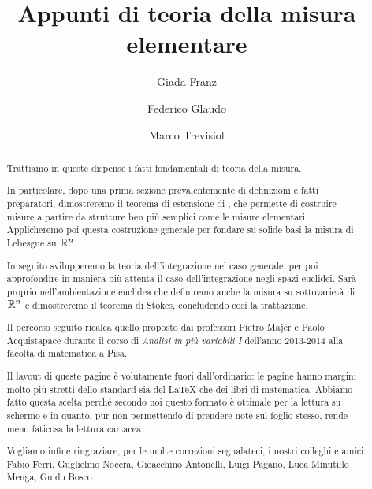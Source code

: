 \documentclass[a4paper,12pt]{article}
\title{Appunti di teoria della misura elementare}
\author{Giada Franz \and Federico Glaudo \and Marco Trevisiol}
\begin{document}
\maketitle

\begin{abstract}
	Trattiamo in queste dispense i fatti fondamentali di teoria della misura.
	
	In particolare, dopo una prima sezione prevalentemente di definizioni e fatti preparatori, dimostreremo il teorema di estensione di \carat{}, che permette di costruire misure a partire da strutture ben più semplici come le misure elementari. Applicheremo poi questa costruzione generale per fondare su solide basi la misura di Lebesgue su $\mathbb R^n$.
	
	In seguito svilupperemo la teoria dell'integrazione nel caso generale, per poi approfondire in maniera più attenta il caso dell'integrazione negli spazi euclidei. Sarà proprio nell'ambientazione euclidea che definiremo anche la misura su sottovarietà di $\mathbb R^n$ e dimostreremo il teorema di Stokes, concludendo così la trattazione.
	
	Il percorso seguito ricalca quello proposto dai professori Pietro Majer e Paolo Acquistapace durante il corso di \textit{Analisi in più variabili I} dell'anno 2013-2014 alla facoltà di matematica a Pisa.
	
	Il layout di queste pagine è volutamente fuori dall'ordinario: le pagine hanno margini molto più stretti dello standard sia del \LaTeX{} che dei libri di matematica. 
	Abbiamo fatto questa scelta perché secondo noi questo formato è ottimale per la lettura su schermo e in quanto, pur non permettendo di prendere note sul foglio stesso, rende meno faticosa la lettura cartacea.
	
	Vogliamo infine ringraziare, per le molte correzioni segnalateci, i nostri colleghi e amici: Fabio Ferri, Guglielmo Nocera, Gioacchino Antonelli, Luigi Pagano, Luca Minutillo Menga, Guido Bosco.
\end{abstract}
\clearpage

\tableofcontents
\clearpage











\printindex
\end{document}
